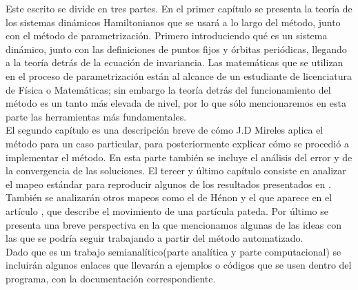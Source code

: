Este escrito se divide en tres partes. En el primer capítulo se presenta la teoría de los sistemas dinámicos Hamiltonianos que se usará a lo largo del método, junto con el método de parametrización. Primero introduciendo qué es un sistema dinámico, junto con las definiciones de puntos fijos y órbitas periódicas, llegando a la teoría detrás de la ecuación de invariancia. Las matemáticas que se utilizan en el proceso de parametrización están al alcance de un estudiante de licenciatura de Física o Ma\-te\-má\-ti\-cas; sin embargo la teoría detrás del funcionamiento del método es un tanto más elevada de nivel, por lo que sólo mencionaremos en esta parte las herramientas más fundamentales.  \\


El segundo capítulo es una descripción breve de cómo J.D Mireles aplica el método para un caso particular, para posteriormente explicar cómo se procedió a implementar el método. En esta parte también se incluye el análisis del error y de la convergencia de las soluciones. El tercer y último capítulo consiste en analizar el mapeo estándar para reproducir algunos de los resultados presentados en \cite{Mireles}. También se analizarán otros mapeos como el de Hénon y el que aparece en el artículo \cite{Jung}, que describe el movimiento de una partícula pateda. Por último se presenta una breve perspectiva en la que mencionamos algunas de las ideas con las que se podría seguir trabajando a partir del método automatizado. \\

Dado que es un trabajo semianalítico(parte analítica y parte computacional) se incluirán algunos enlaces que llevarán a ejemplos o códigos que se usen dentro del programa, con la documentación correspondiente. 

